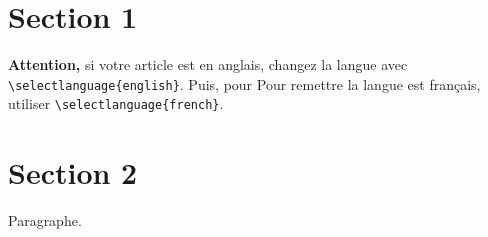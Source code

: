 \newpage
\section{Section 1} \label{sec:titre_articlesection1}

\textbf{Attention,} si votre article est en anglais, changez la langue avec \texttt{\textbackslash selectlanguage\{english\}}. Puis, pour Pour remettre la langue est français, utiliser \texttt{\textbackslash selectlanguage\{french\}}.

\lipsum[1-4] %


\section{Section 2} \label{sec:titre_articlesection2}

Paragraphe.

\lipsum[1-4] %


